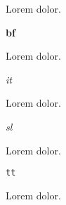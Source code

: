 



{}


Lorem  dolor.

{\bf bf}

Lorem  dolor.

{\it it}

Lorem  dolor.

{\sl sl}

Lorem  dolor.

{\tt tt}

Lorem  dolor.

\bye
